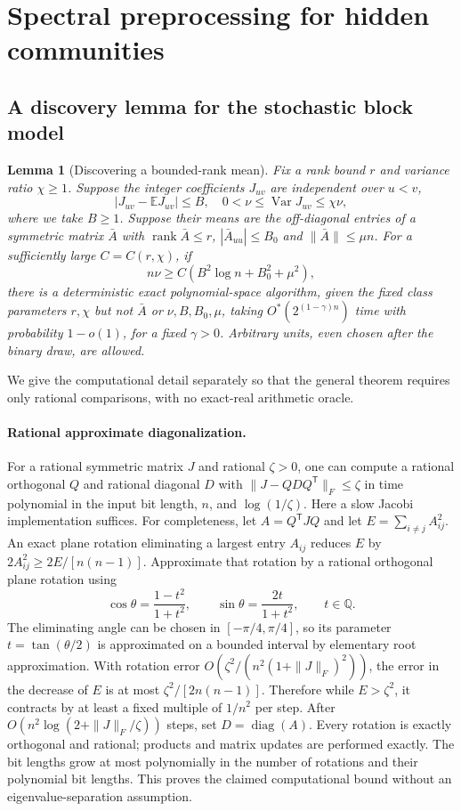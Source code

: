 \documentclass[11pt,a4paper]{article}
\newtheorem{lemma}[theorem]{Lemma}
\theoremstyle{definition}
\theoremstyle{remark}
\newcommand{\Ostar}{O^{*}}
\newcommand{\E}{\mathbb E}
\DeclareMathOperator{\rank}{rank}
\begin{document}
\section{Spectral preprocessing for hidden communities}\label{app:discovery}

\subsection{A discovery lemma for the stochastic block model}

\begin{lemma}[Discovering a bounded-rank mean]\label{cor:planted}
Fix a rank bound $r$ and variance ratio $\chi\ge1$. Suppose the integer
coefficients $J_{uv}$ are independent over $u<v$,
\[
 |J_{uv}-\E J_{uv}|\le B,\quad
 0<\nu\le\operatorname{Var}J_{uv}\le\chi\nu,
\]
where we take $B\ge1$. Suppose their means are the off-diagonal entries
of a symmetric matrix $\bar A$ with
$\rank\bar A\le r$, $|\bar A_{uu}|\le B_0$ and $\|\bar A\|\le\mu n$.
For a sufficiently large $C=C(r,\chi)$, if
\[
 n\nu\ge C(B^2\log n+B_0^2+\mu^2),
\]
there is a deterministic exact polynomial-space algorithm, given the fixed
class parameters $r,\chi$ but not $\bar A$ or $\nu,B,B_0,\mu$, taking
$\Ostar(2^{(1-\gamma)n})$ time with probability $1-o(1)$, for a fixed
$\gamma>0$. Arbitrary units, even chosen after the binary draw, are allowed.
\end{lemma}


We give the computational detail separately so that the general theorem
requires only rational comparisons, with no exact-real arithmetic oracle.

\paragraph{Rational approximate diagonalization.}
For a rational symmetric matrix $J$ and rational $\zeta>0$, one can compute
a rational orthogonal $Q$ and rational diagonal $D$ with
$\|J-QDQ^{\mathsf T}\|_F\le\zeta$ in time polynomial in the input bit
length, $n$, and $\log(1/\zeta)$. Here a slow Jacobi implementation suffices.
For completeness, let $A=Q^{\mathsf T}JQ$ and let
$E=\sum_{i\ne j}A_{ij}^2$. An exact plane rotation eliminating a largest
entry $A_{ij}$ reduces $E$ by $2A_{ij}^2\ge2E/[n(n-1)]$.
Approximate that rotation by a rational orthogonal plane rotation using
\[
 \cos\theta=\frac{1-t^2}{1+t^2},\qquad
 \sin\theta=\frac{2t}{1+t^2},\qquad t\in\mathbb Q.
\]
The eliminating angle can be chosen in $[-\pi/4,\pi/4]$, so its parameter
$t=\tan(\theta/2)$ is approximated on a bounded interval by elementary
root approximation. With rotation error
$O(\zeta^2/(n^2(1+\|J\|_F)^2))$, the error in the decrease of $E$ is at
most $\zeta^2/[2n(n-1)]$. Therefore while $E>\zeta^2$, it contracts by
at least a fixed multiple of $1/n^2$ per step. After
$O(n^2\log(2+\|J\|_F/\zeta))$ steps, set $D=\operatorname{diag}(A)$.
Every rotation is exactly orthogonal and rational; products and matrix
updates are performed exactly. The bit lengths grow at most polynomially
in the number of rotations and their polynomial bit lengths. This proves
the claimed computational bound without an eigenvalue-separation assumption.
\end{document}
